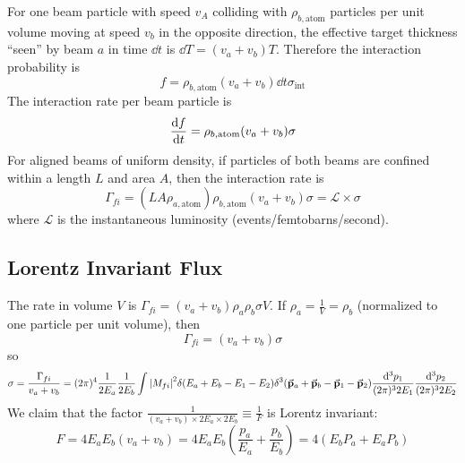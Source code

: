 \documentclass[a4paper,twoside,master.tex]{subfiles}
\begin{document}
For one beam particle with speed $ v_A $ colliding with $ \rho_{b, \text{atom}} $ particles per unit volume moving at speed $ v_b $ in the opposite direction, the effective target thickness ``seen'' by beam $ a $ in time $ \dd{t} $ is $ \dd{T} = (v_a + v_b)T $. Therefore the interaction probability is
\begin{equation}
    f = \rho_{b, \text{atom}} (v_a + v_b) \dd{t} \sigma_{\text{int}}
\end{equation}
The interaction rate per beam particle is
\begin{equation}
    \dv{f}{t} = \rho_{b, \text{atom}} (v_a + v_b) \sigma
\end{equation}
For aligned beams of uniform density, if particles of both beams are confined within a length $ L $ and area $ A $, then the interaction rate is
\begin{equation}
    \Gamma_{f i} = (LA \rho_{a, \text{atom}}) \rho_{b, \text{atom}}(v_a + v_b) \sigma = \mathcal{L} \times \sigma
\end{equation}
where $ \mathcal{L} $ is the instantaneous luminosity (events/femtobarns/second).

\subsection{Lorentz Invariant Flux}\label{sub:lorentz_invariant_flux}

The rate in volume $ V $ is $ \Gamma_{f i} = (v_a + v_b) \rho_a \rho_b \sigma V $. If $ \rho_a = \frac{1}{V} = \rho_b $ (normalized to one particle per unit volume), then
\begin{equation}
    \Gamma_{f i} =(v_a + v_b) \sigma
\end{equation}
so
\begin{equation}
    \sigma = \frac{\Gamma_{f i}}{v_a + v_b} = (2 \pi)^4 \frac{1}{2 E_a} \frac{1}{2 E_b} \int \abs{M_{f i}}^2 \delta(E_a + E_b - E_1 - E_2) \delta^3(\va{p}_a + \va{p}_b - \va{p}_1 - \va{p}_2) \frac{\dd[3]{p_1}}{(2 \pi)^3 2E_1} \frac{\dd[3]{p_2}}{(2 \pi)^3 2E_2} 
\end{equation}
We claim that the factor $ \frac{1}{(v_a + v_b) \times 2 E_a \times 2 E_b} \equiv \frac{1}{F} $ is Lorentz invariant:
\begin{equation}
    F = 4 E_a E_b(v_a + v_b) = 4 E_a E_b \left( \frac{p_a}{E_a} + \frac{p_b}{E_b} \right) = 4(E_b P_a + E_a P_b)
\end{equation}
\end{document}
